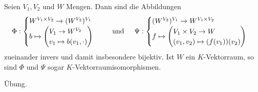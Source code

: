 \documentclass[../../main.tex]{subfiles}
\begin{document}
\begin{lem}\label{13.2.5} 
	Seien $V_1,V_2$ und $W$ Mengen. Dann sind die Abbildungen
	\begin{align*}
		\Phi: \begin{cases}W^{V_1\times V_2}\to(W^{V_2})^{V_1}\\ b\mapsto\begin{pmatrix*}[l]V_1\to W^{V_2}\\ v_1\mapsto b(v_1,\cdot)\end{pmatrix*}\end{cases}\hspace{0.5cm}\text{und}\hspace{0.5cm}
		\Psi: \begin{cases}(W^{V_2})^{V_1}\to W^{V_1\times V_2}\\f\mapsto\begin{pmatrix*}[l] V_1\times V_2\to W\\ (v_1,v_2)\mapsto (f(v_1))(v_2)\end{pmatrix*}\end{cases}
	\end{align*}
	zueinander invers und damit insbesondere bijektiv. Ist $W$ ein $K$-Vektorraum, so sind $\Phi$ und $\Psi$ sogar $K$-Vektorraumisomorphismen.
\end{lem}
\begin{cproof}
	Übung.
\end{cproof}
\end{document}
